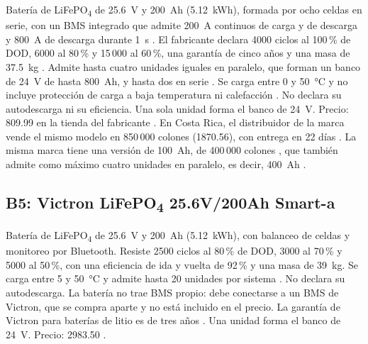 Batería de LiFePO\textsubscript{4} de \SI{25.6}{V} y \SI{200}{Ah} (\SI{5.12}{kWh}), formada por ocho celdas en serie, con un BMS integrado que admite \SI{200}{A} continuos de carga y de descarga y \SI{800}{A} de descarga durante \SI{1}{s} \cite{pq_manual}. El fabricante declara 4000 ciclos al 100\,\% de DOD, 6000 al 80\,\% y 15\,000 al 60\,\%, una garantía de cinco años y una masa de \SI{37.5}{kg} \cite{pq}. Admite hasta cuatro unidades iguales en paralelo, que forman un banco de \SI{24}{V} de hasta \SI{800}{Ah}, y hasta dos en serie \cite{pq_manual}. Se carga entre 0 y \SI{50}{\celsius} y no incluye protección de carga a baja temperatura ni calefacción \cite{pq}. No declara su autodescarga ni su eficiencia. Una sola unidad forma el banco de \SI{24}{V}. Precio: \SI{809.99}{\USD} en la tienda del fabricante \cite{pq}. En Costa Rica, el distribuidor de la marca vende el mismo modelo en 850\,000 colones (\SI{1870.56}{\USD}), con entrega en 22 días \cite{kuat}. La misma marca tiene una versión de \SI{100}{Ah}, de 400\,000 colones \cite{kuat100}, que también admite como máximo cuatro unidades en paralelo, es decir, \SI{400}{Ah} \cite{pq100_manual}.

\subsection{B5: Victron LiFePO\textsubscript{4} 25.6V/200Ah Smart-a}

Batería de LiFePO\textsubscript{4} de \SI{25.6}{V} y \SI{200}{Ah} (\SI{5.12}{kWh}), con balanceo de celdas y monitoreo por Bluetooth. Resiste 2500 ciclos al 80\,\% de DOD, 3000 al 70\,\% y 5000 al 50\,\%, con una eficiencia de ida y vuelta de 92\,\% y una masa de \SI{39}{kg}. Se carga entre 5 y \SI{50}{\celsius} y admite hasta 20 unidades por sistema \cite{victron_ds}. No declara su autodescarga. La batería no trae BMS propio: debe conectarse a un BMS de Victron, que se compra aparte \cite{victron_manual} y no está incluido en el precio. La garantía de Victron para baterías de litio es de tres años \cite{victron_war}. Una unidad forma el banco de \SI{24}{V}. Precio: \SI{2983.50}{\USD} \cite{victron_precio}.

